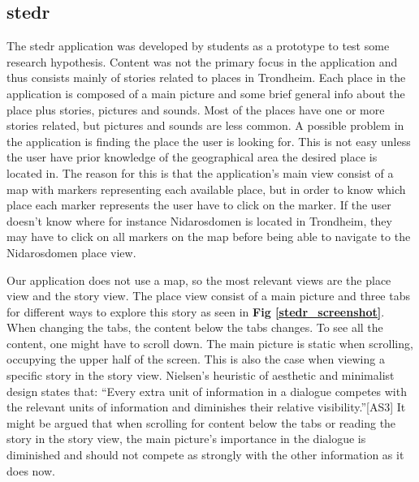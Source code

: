 \subsection{stedr}

The stedr application was developed by students as a prototype to test some research hypothesis. Content was not the primary focus in the application and thus consists mainly of stories related to places in Trondheim. Each place in the application is composed of a main picture and some brief general info about the place plus stories, pictures and sounds. Most of the places have one or more stories related, but pictures and sounds are less common. A possible problem in the application is finding the place the user is looking for. This is not easy unless the user have prior knowledge of the geographical area the desired place is located in. The reason for this is that the application’s main view consist of a map with markers representing each available place, but in order to know which place each marker represents the user have to click on the marker. If the user doesn’t know where for instance Nidarosdomen is located in Trondheim, they may have to click on all markers on the map before being able to navigate to the Nidarosdomen place view. \newline

Our application does not use a map, so the most relevant views are the place view and the story view. The place view consist of a main picture and three tabs for different ways to explore this story as seen in \textbf{Fig \ref{stedr_screenshot}}. When changing the tabs, the content below the tabs changes. To see all the content, one might have to scroll down. The main picture is static when scrolling, occupying the upper half of the screen. This is also the case when viewing a specific story in the story view. Nielsen’s heuristic of aesthetic and minimalist design states that: “Every extra unit of information in a dialogue competes with the relevant units of information and diminishes their relative visibility.”[AS3] It might be argued that when scrolling for content below the tabs or reading the story in the story view, the main picture’s importance in the dialogue is diminished and should not compete as strongly with the other information as it does now. \newline

